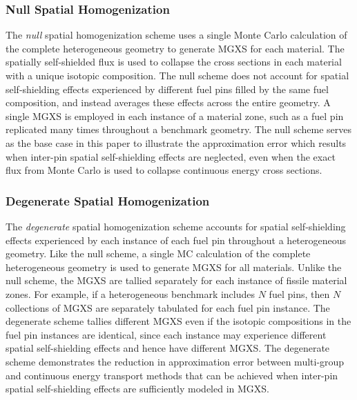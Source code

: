 \subsubsection{Null Spatial Homogenization}
\label{subsubsec:homogenize-null}

The \textit{null} spatial homogenization scheme uses a single Monte Carlo calculation of the complete heterogeneous geometry to generate MGXS for each material. The spatially self-shielded flux is used to collapse the cross sections in each material with a unique isotopic composition. The null scheme does not account for spatial self-shielding effects experienced by different fuel pins filled by the same fuel composition, and instead averages these effects across the entire geometry. A single MGXS is employed in each instance of a material zone, such as a fuel pin replicated many times throughout a benchmark geometry. The null scheme serves as the base case in this paper to illustrate the approximation error which results when inter-pin spatial self-shielding effects are neglected, even when the exact flux from Monte Carlo is used to collapse continuous energy cross sections.


\subsubsection{Degenerate Spatial Homogenization}
\label{subsubsec:homogenize-degenerate}

The \textit{degenerate} spatial homogenization scheme accounts for spatial self-shielding effects experienced by each instance of each fuel pin throughout a heterogeneous geometry. Like the null scheme, a single MC calculation of the complete heterogeneous geometry is used to generate MGXS for all materials. Unlike the null scheme, the MGXS are tallied separately for each instance of fissile material zones. For example, if a heterogeneous benchmark includes $N$ fuel pins, then $N$ collections of MGXS are separately tabulated for each fuel pin instance. The degenerate scheme tallies different MGXS even if the isotopic compositions in the fuel pin instances are identical, since each instance may experience different spatial self-shielding effects and hence have different MGXS. The degenerate scheme demonstrates the reduction in approximation error between multi-group and continuous energy transport methods that can be achieved when inter-pin spatial self-shielding effects are sufficiently modeled in MGXS.